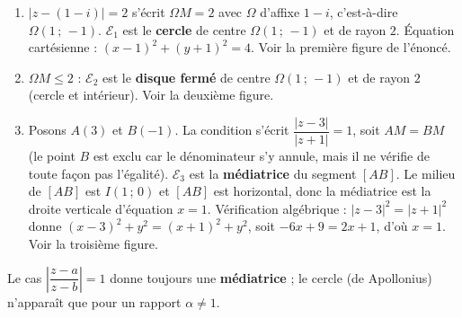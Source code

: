 \documentclass[11pt]{article}
\begin{document}
\begin{corrige}
\begin{enumerate}
\item $|z - (1 - i)| = 2$ s'écrit $\Omega M = 2$ avec $\Omega$ d'affixe $1 - i$, c'est-à-dire $\Omega(1\,;\,-1)$. $\mathcal{E}_1$ est le \textbf{cercle} de centre $\Omega(1\,;\,-1)$ et de rayon $2$. Équation cartésienne : $(x - 1)^2 + (y + 1)^2 = 4$. Voir la première figure de l'énoncé.
\item $\Omega M \leq 2$ : $\mathcal{E}_2$ est le \textbf{disque fermé} de centre $\Omega(1\,;\,-1)$ et de rayon $2$ (cercle et intérieur). Voir la deuxième figure.
\item Posons $A(3)$ et $B(-1)$. La condition s'écrit $\dfrac{|z - 3|}{|z + 1|} = 1$, soit $AM = BM$ (le point $B$ est exclu car le dénominateur s'y annule, mais il ne vérifie de toute façon pas l'égalité). $\mathcal{E}_3$ est la \textbf{médiatrice} du segment $[AB]$. Le milieu de $[AB]$ est $I(1\,;\,0)$ et $[AB]$ est horizontal, donc la médiatrice est la droite verticale d'équation $x = 1$. Vérification algébrique : $|z - 3|^2 = |z + 1|^2$ donne $(x-3)^2 + y^2 = (x+1)^2 + y^2$, soit $-6x + 9 = 2x + 1$, d'où $x = 1$. Voir la troisième figure.
\end{enumerate}
\end{corrige}

\begin{attention}
Le cas $\left|\dfrac{z - a}{z - b}\right| = 1$ donne toujours une \textbf{médiatrice} ; le cercle (de Apollonius) n'apparaît que pour un rapport $\alpha \neq 1$.
\end{attention}
\end{document}
